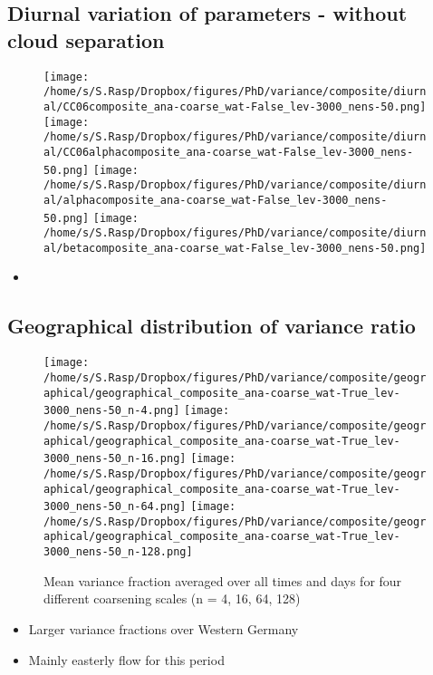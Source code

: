 \documentclass[a4paper, 12pt]{article}
\begin{document}
\subsection{Diurnal variation of parameters - without cloud separation}
\begin{figure}[h!]
\noindent \centering
\texttt{[image: /home/s/S.Rasp/Dropbox/figures/PhD/variance/composite/diurnal/CC06composite\_ana-coarse\_wat-False\_lev-3000\_nens-50.png]}
\texttt{[image: /home/s/S.Rasp/Dropbox/figures/PhD/variance/composite/diurnal/CC06alphacomposite\_ana-coarse\_wat-False\_lev-3000\_nens-50.png]}
\texttt{[image: /home/s/S.Rasp/Dropbox/figures/PhD/variance/composite/diurnal/alphacomposite\_ana-coarse\_wat-False\_lev-3000\_nens-50.png]}
\texttt{[image: /home/s/S.Rasp/Dropbox/figures/PhD/variance/composite/diurnal/betacomposite\_ana-coarse\_wat-False\_lev-3000\_nens-50.png]}\\
\caption{} \label{fig:geographical}
\end{figure}
\begin{itemize}
 \item 
\end{itemize}

\newpage

\subsection{Geographical distribution of variance ratio}
\begin{figure}[h!]
\noindent \centering
\texttt{[image: /home/s/S.Rasp/Dropbox/figures/PhD/variance/composite/geographical/geographical\_composite\_ana-coarse\_wat-True\_lev-3000\_nens-50\_n-4.png]}
\texttt{[image: /home/s/S.Rasp/Dropbox/figures/PhD/variance/composite/geographical/geographical\_composite\_ana-coarse\_wat-True\_lev-3000\_nens-50\_n-16.png]}
\texttt{[image: /home/s/S.Rasp/Dropbox/figures/PhD/variance/composite/geographical/geographical\_composite\_ana-coarse\_wat-True\_lev-3000\_nens-50\_n-64.png]}
\texttt{[image: /home/s/S.Rasp/Dropbox/figures/PhD/variance/composite/geographical/geographical\_composite\_ana-coarse\_wat-True\_lev-3000\_nens-50\_n-128.png]}\\
\caption{Mean variance fraction averaged over all times and days for four different coarsening scales (n = 4, 16, 64, 128)} \label{fig:geographical}
\end{figure}
\begin{itemize}
 \item Larger variance fractions over Western Germany
 \item Mainly easterly flow for this period
\end{itemize}
\end{document}
